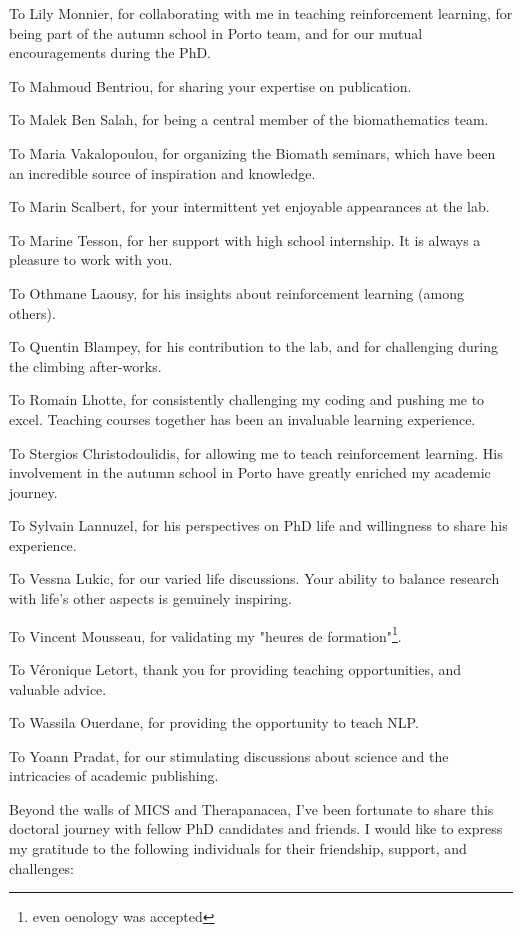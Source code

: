 To Lily Monnier, for collaborating with me in teaching reinforcement learning, for being part of the autumn school in Porto team, and for our mutual encouragements during the PhD.

To Mahmoud Bentriou, for sharing your expertise on publication.

To Malek Ben Salah, for being a central member of the biomathematics team.

To Maria Vakalopoulou, for organizing the Biomath seminars, which have been an incredible source of inspiration and knowledge.

To Marin Scalbert, for your intermittent yet enjoyable appearances at the lab.

To Marine Tesson, for her support with high school internship.
It is always a pleasure to work with you.


To Othmane Laousy, for his insights about reinforcement learning (among others).

To Quentin Blampey, for his contribution to the lab, and for challenging during the climbing after-works.

To Romain Lhotte, for consistently challenging my coding and pushing me to excel.
Teaching courses together has been an invaluable learning experience.

To Stergios Christodoulidis, for allowing me to teach reinforcement learning.
His involvement in the autumn school in Porto have greatly enriched my academic journey.

To Sylvain Lannuzel, for his perspectives on PhD life and willingness to share his experience.

To Vessna Lukic, for our varied life discussions.
Your ability to balance research with life's other aspects is genuinely inspiring.

To Vincent Mousseau, for validating my "heures de formation"\footnote{even oenology was accepted}.

To Véronique Letort, thank you for providing teaching opportunities, and valuable advice.

To Wassila Ouerdane, for providing the opportunity to teach NLP.

To Yoann Pradat, for our stimulating discussions about science and the intricacies of academic publishing.



Beyond the walls of MICS and Therapanacea, I've been fortunate to share this doctoral journey with fellow PhD candidates and friends.
I would like to express my gratitude to the following individuals for their friendship, support, and challenges:

